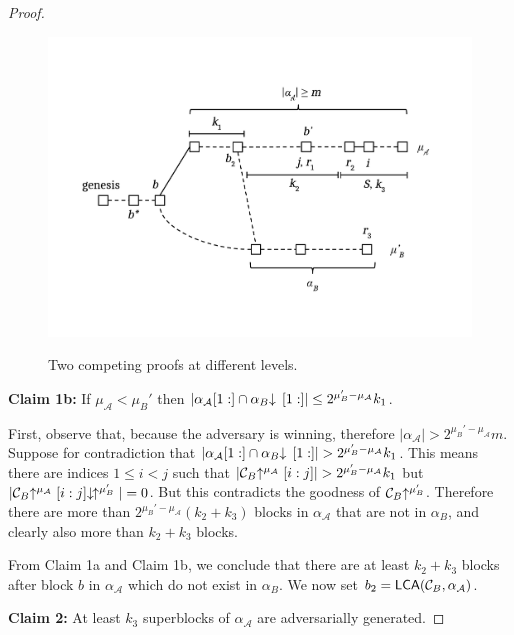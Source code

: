 \begin{proof}
    \begin{figure}
        \caption{Two competing proofs at different levels.}
        \centering
        \includegraphics[width=0.8 \columnwidth,keepaspectratio]{figures/security-proof-chain.pdf}
        \label{fig.sec-comparison}
    \end{figure}

    \textbf{Claim 1b: } If $\mu_\mathcal{A} < \mu_B'$ then
    $|\alpha_\mathcal{A}[1:] \cap \alpha_B\negthickspace\downarrow\,[1:]| \leq 2^{\mu_B' - \mu_\mathcal{A}} k_1$.

    First, observe that, because the adversary is winning, therefore
    $|\alpha_\mathcal{A}| > 2^{\mu_B' - \mu_\mathcal{A}}m$.
    Suppose for contradiction that $|\alpha_\mathcal{A}[1:] \cap
    \alpha_B\negthickspace\downarrow\,[1:]| > 2^{\mu_B' - \mu_\mathcal{A}} k_1$. This means
    there are indices $1 \leq i < j$ such that
    $|\mathcal{C}_B\negthickspace\uparrow^{\mu_\mathcal{A}}[i:j]| > 2^{\mu_B' - \mu_\mathcal{A}}
    k_1$ but
    $|\mathcal{C}_B\negthickspace\uparrow^{\mu_\mathcal{A}}[i:j]\negthickspace\downarrow\,\negthickspace\uparrow^{\mu_B'}| = 0$.
    But this contradicts the goodness of $\mathcal{C}_B\negthickspace\uparrow^{\mu_B'}$. Therefore
    there are more than $2^{\mu_B' - \mu_\mathcal{A}}(k_2 + k_3)$ blocks in
    $\alpha_\mathcal{A}$ that are not in $\alpha_B$, and clearly also more than $k_2 + k_3$ blocks.

    From Claim 1a and Claim 1b, we conclude that there are at least $k_2 + k_3$
    blocks after block $b$ in $\alpha_\mathcal{A}$ which do not exist in
    $\alpha_B$. We now set $b_2 = \textsf{LCA}(\mathcal{C}_B, \alpha_\mathcal{A})$.

    \textbf{Claim 2: } At least $k_3$ superblocks of $\alpha_\mathcal{A}$ are
    adversarially generated.


\end{proof}
